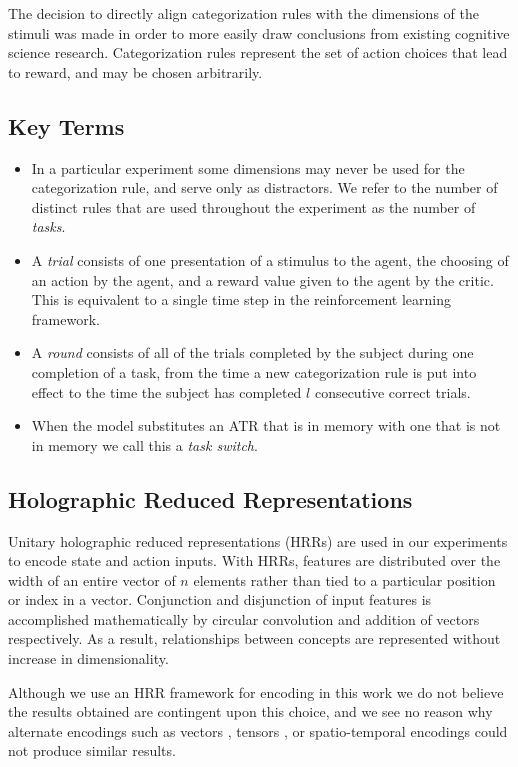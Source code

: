 \documentclass[10pt,letterpaper]{article}
\begin{document}
The decision to directly align categorization rules with the dimensions of the stimuli was made in order to more easily draw conclusions from existing cognitive science research. Categorization rules represent the set of action choices that lead to reward, and may be chosen arbitrarily.

\subsection{Key Terms}

\begin{itemize}
\item In a particular experiment some dimensions may never be used for the categorization rule, and serve only as distractors. We refer to the number of distinct rules that are used throughout the experiment as the number of \textit{tasks}. 
\item A \textit{trial} consists of one presentation of a stimulus to the agent, the choosing of an action by the agent, and a reward value given to the agent by the critic. This is equivalent to a single time step in the reinforcement learning framework. 
\item A \textit{round} consists of all of the trials completed by the subject during one completion of a task, from the time a new categorization rule is put into effect to the time the subject has completed $l$ consecutive correct trials. 
\item When the model substitutes an ATR that is in memory with one that is not in memory we call this a \textit{task switch}. 
\end{itemize}

\subsection{Holographic Reduced Representations}
\label{sec:hrr}

Unitary holographic reduced representations (HRRs) \cite{plate_holographic_1995} are used in our experiments to encode state and action inputs. With HRRs, features are distributed over the width of an entire vector of $ n $ elements rather than tied to a particular position or index in a vector. Conjunction and disjunction of input features is accomplished mathematically by circular convolution and addition of vectors respectively. As a result, relationships between concepts are represented without increase in dimensionality. 

Although we use an HRR framework for encoding in this work we do not believe the results obtained are contingent upon this choice, and we see no reason why alternate encodings such as vectors \cite{mitchell_composition_2010}, tensors \cite{papalexakis_tensors_2016}, or spatio-temporal encodings \cite{hummel_distributed_1997} could not produce similar results.
\end{document}
